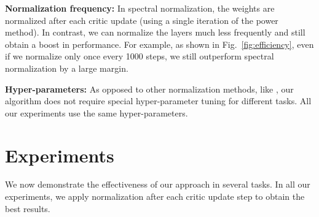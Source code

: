 \documentclass[letterpaper]{article} %
\begin{document}
	\noindent\textbf{Normalization frequency:} In spectral normalization, the weights are normalized after each critic update (using a single iteration of the power method). In contrast, we can normalize the layers much less frequently and still obtain a boost in performance. For example, as shown in Fig.~\ref{fig:efficiency}, even if we normalize only once every 1000 steps, we still outperform spectral normalization by a large margin.
	
	\noindent\textbf{Hyper-parameters:} As opposed to other normalization methods, like \cite{arjovsky2017towards,gulrajani2017improved,ioffe2015batch,salimans2016weight,brock2016neural,spectral}, our algorithm does not require special hyper-parameter tuning for different tasks. All our experiments use the same hyper-parameters.


\section{Experiments}
We now demonstrate the effectiveness of our approach in several  tasks. In all our experiments, we apply normalization after each critic update step to obtain the best results.
\end{document}
